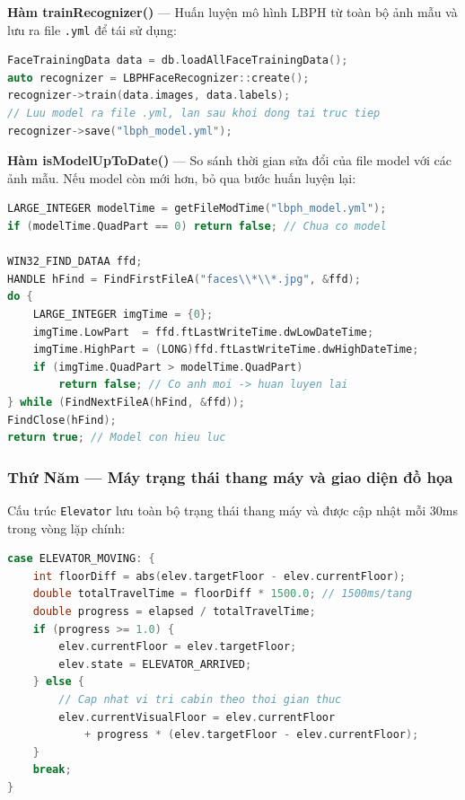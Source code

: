 \documentclass[12pt,a4paper]{article}
\begin{document}
\textbf{Hàm trainRecognizer()} --- Huấn luyện mô hình LBPH từ toàn bộ ảnh mẫu và lưu ra file \texttt{.yml} để tái sử dụng:

\begin{lstlisting}[language=C++, caption={Huấn luyện và lưu mô hình LBPH}]
FaceTrainingData data = db.loadAllFaceTrainingData();
auto recognizer = LBPHFaceRecognizer::create();
recognizer->train(data.images, data.labels);
// Luu model ra file .yml, lan sau khoi dong tai truc tiep
recognizer->save("lbph_model.yml");
\end{lstlisting}

\textbf{Hàm isModelUpToDate()} --- So sánh thời gian sửa đổi của file model với các ảnh mẫu. Nếu model còn mới hơn, bỏ qua bước huấn luyện lại:

\begin{lstlisting}[language=C++, caption={Kiểm tra model cache còn hiệu lực không}]
LARGE_INTEGER modelTime = getFileModTime("lbph_model.yml");
if (modelTime.QuadPart == 0) return false; // Chua co model

WIN32_FIND_DATAA ffd;
HANDLE hFind = FindFirstFileA("faces\\*\\*.jpg", &ffd);
do {
    LARGE_INTEGER imgTime = {0};
    imgTime.LowPart  = ffd.ftLastWriteTime.dwLowDateTime;
    imgTime.HighPart = (LONG)ffd.ftLastWriteTime.dwHighDateTime;
    if (imgTime.QuadPart > modelTime.QuadPart)
        return false; // Co anh moi -> huan luyen lai
} while (FindNextFileA(hFind, &ffd));
FindClose(hFind);
return true; // Model con hieu luc
\end{lstlisting}

\subsubsection{Thứ Năm --- Máy trạng thái thang máy và giao diện đồ họa}

Cấu trúc \texttt{Elevator} lưu toàn bộ trạng thái thang máy và được cập nhật mỗi 30ms trong vòng lặp chính:

\begin{lstlisting}[language=C++, caption={Cập nhật trạng thái ELEVATOR\_MOVING}]
case ELEVATOR_MOVING: {
    int floorDiff = abs(elev.targetFloor - elev.currentFloor);
    double totalTravelTime = floorDiff * 1500.0; // 1500ms/tang
    double progress = elapsed / totalTravelTime;
    if (progress >= 1.0) {
        elev.currentFloor = elev.targetFloor;
        elev.state = ELEVATOR_ARRIVED;
    } else {
        // Cap nhat vi tri cabin theo thoi gian thuc
        elev.currentVisualFloor = elev.currentFloor
            + progress * (elev.targetFloor - elev.currentFloor);
    }
    break;
}
\end{lstlisting}
\end{document}
